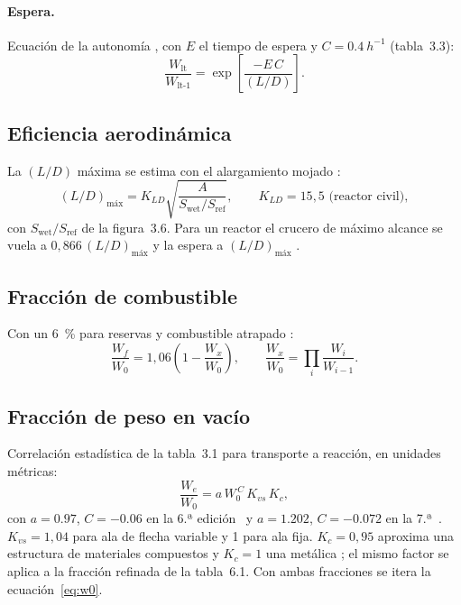 \documentclass[11pt,a4paper]{article}
\newcommand{\WO}{W_0}
\begin{document}
\paragraph{Espera.} Ecuación de la autonomía \cite[ec.~3.8]{raymer6}, con
$E$ el tiempo de espera y $C=\SI{0.4}{h^{-1}}$ (tabla~3.3):
\begin{equation}
  \frac{W_\text{lt}}{W_\text{lt-1}} = \exp\!\left[\frac{-E\,C}{(L/D)}\right].
\end{equation}

\subsection{Eficiencia aerodinámica}
La $(L/D)$ máxima se estima con el alargamiento mojado
\cite[ec.~3.12]{raymer6}:
\begin{equation}
  (L/D)_\text{máx} = K_{LD}\sqrt{\frac{A}{S_\text{wet}/S_\text{ref}}},
  \qquad K_{LD} = 15{,}5 \text{ (reactor civil)},
\end{equation}
con $S_\text{wet}/S_\text{ref}$ de la figura~3.6. Para un reactor el crucero
de máximo alcance se vuela a $0{,}866\,(L/D)_\text{máx}$ y la espera a
$(L/D)_\text{máx}$ \cite[cap.~3]{raymer6}.

\subsection{Fracción de combustible}
Con un \SI{6}{\percent} para reservas y combustible atrapado
\cite[ec.~3.13]{raymer6}:
\begin{equation}
  \frac{W_f}{\WO} = 1{,}06\left(1 - \frac{W_x}{\WO}\right),
  \qquad \frac{W_x}{\WO} = \prod_i \frac{W_i}{W_{i-1}} .
\end{equation}

\subsection{Fracción de peso en vacío}
Correlación estadística de la tabla~3.1 para transporte a reacción, en
unidades métricas:
\begin{equation}
  \frac{W_e}{\WO} = a\,\WO^{\,C}\,K_{vs}\,K_c,
\end{equation}
con $a=\num{0.97}$, $C=\num{-0.06}$ en la 6.ª edición~\cite{raymer6} y
$a=\num{1.202}$, $C=\num{-0.072}$ en la 7.ª~\cite{raymer7}. $K_{vs}=1{,}04$
para ala de flecha variable y 1 para ala fija. $K_c=0{,}95$ aproxima una
estructura de materiales compuestos y $K_c=1$ una metálica
\cite[cap.~3]{raymer6}; el mismo factor se aplica a la fracción refinada de la
tabla~6.1. Con ambas fracciones se itera la ecuación~\eqref{eq:w0}.
\end{document}
